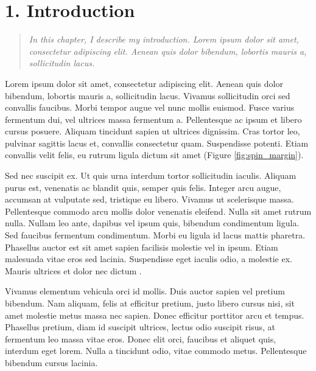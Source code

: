 \chapter{1. Introduction}

\begin{quote}
\textit{In this chapter, I describe my introduction. Lorem ipsum dolor sit amet, consectetur adipiscing elit. Aenean quis dolor bibendum, lobortis mauris a, sollicitudin lacus.} \newline
\end{quote}

Lorem ipsum dolor sit amet, consectetur adipiscing elit. Aenean quis dolor bibendum, lobortis mauris a, sollicitudin lacus. Vivamus sollicitudin orci sed convallis faucibus. Morbi tempor augue vel nunc mollis euismod. Fusce varius fermentum dui, vel ultrices massa fermentum a. Pellentesque ac ipsum et libero cursus posuere. Aliquam tincidunt sapien ut ultrices dignissim. Cras tortor leo, pulvinar sagittis lacus et, convallis consectetur quam. Suspendisse potenti. Etiam convallis velit felis, eu rutrum ligula dictum sit amet (Figure \ref{fig:spin_margin}).


Sed nec suscipit ex. Ut quis urna interdum tortor sollicitudin iaculis. Aliquam purus est, venenatis ac blandit quis, semper quis felis. Integer arcu augue, accumsan at vulputate sed, tristique eu libero. Vivamus ut scelerisque massa. Pellentesque commodo arcu mollis dolor venenatis eleifend. Nulla sit amet rutrum nulla. Nullam leo ante, dapibus vel ipsum quis, bibendum condimentum ligula. Sed faucibus fermentum condimentum. Morbi eu ligula id lacus mattis pharetra. Phasellus auctor est sit amet sapien facilisis molestie vel in ipsum. Etiam malesuada vitae eros sed lacinia. Suspendisse eget iaculis odio, a molestie ex. Mauris ultrices et dolor nec dictum \cite{tseng_dis_spin}.

Vivamus elementum vehicula orci id mollis. Duis auctor sapien vel pretium bibendum. Nam aliquam, felis at efficitur pretium, justo libero cursus nisi, sit amet molestie metus massa nec sapien. Donec efficitur porttitor arcu et tempus. Phasellus pretium, diam id suscipit ultrices, lectus odio suscipit risus, at fermentum leo massa vitae eros. Donec elit orci, faucibus et aliquet quis, interdum eget lorem. Nulla a tincidunt odio, vitae commodo metus. Pellentesque bibendum cursus lacinia.

